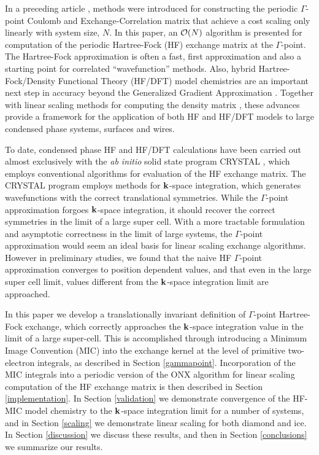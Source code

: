 \documentclass[prb,aps,nobibnotes,twocolumn,doublespace,twocolumngrid,superbib,showpacs]{revtex4}
\begin{document}
In a preceding article \cite{CTymczak04A},  methods were introduced for constructing 
the periodic $\Gamma$-point  Coulomb and Exchange-Correlation matrix that 
achieve  a cost  scaling only linearly with system size, $N$.  In this paper, an ${\cal O}(N)$
algorithm is presented for computation of the periodic Hartree-Fock (HF) exchange matrix at the 
$\Gamma$-point.   The Hartree-Fock approximation is often a fast, first 
approximation and also a starting point for correlated ``wavefunction'' methods.  
Also, hybrid Hartree-Fock/Density Functional Theory (HF/DFT) model chemistries are an important next 
step in accuracy beyond the Generalized Gradient Approximation \cite{Gill92,Becke93,VBarone96,CAdamo99}.
Together with linear scaling methods for computing the density matrix \cite{ANiklasson02A,ANiklasson03}, these 
advances provide a framework for the application of both HF and HF/DFT models to large condensed 
phase systems, surfaces and wires.   

To date, condensed phase HF and HF/DFT calculations have been carried out almost 
exclusively with the {\em ab initio} solid state program {\sc CRYSTAL} \cite{RDovesi00}, 
which employs conventional  algorithms for evaluation of the 
HF exchange matrix.  The {\sc CRYSTAL} program employs methods for ${\bf k}$-space integration, 
which generates wavefunctions with the correct translational symmetries.   While the  
$\Gamma$-point approximation forgoes ${\bf k}$-space integration, it should recover the correct 
symmetries in the limit of a large super cell.  With a more tractable formulation and asymptotic 
correctness in the limit of large systems,  the $\Gamma$-point  approximation would seem an 
ideal basis for linear scaling exchange algorithms.   However in preliminary studies, we found 
that the naive HF $\Gamma$-point approximation converges to position dependent values, and that 
even in the large super cell limit,  values different from the ${\bf k}$-space integration limit 
are approached.

In this paper we develop a translationally invariant definition of $\Gamma$-point 
Hartree-Fock exchange, which correctly approaches the ${\bf k}$-space integration value
in the limit of a large super-cell.  This is accomplished through introducing a Minimum 
Image Convention (MIC) into the exchange kernel at the level of primitive two-electron integrals,  
as described in Section \ref{gammapoint}.  Incorporation of the MIC integrals into a periodic 
version of the {\sc ONX} algorithm \cite{ESchwegler97} for linear scaling computation of the HF 
exchange matrix is then described in Section \ref{implementation}.  In Section \ref{validation} 
we demonstrate convergence of the HF-MIC model chemistry to the $\bf k$-space integration 
limit for a number of systems, and in Section \ref{scaling} we demonstrate linear scaling
for both diamond and ice.  In Section \ref{discussion} we discuss these results,
and then in Section \ref{conclusions} we summarize our results.
\end{document}
